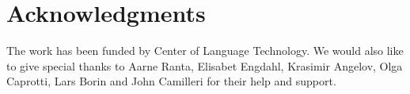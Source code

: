 \documentclass[submission]{eptcs} %
\begin{document}
\section{Acknowledgments}
The work has been funded by Center of Language Technology.
We would also like to give special thanks to Aarne Ranta, %
Elisabet Engdahl, Krasimir Angelov, Olga Caprotti, Lars Borin and John Camilleri for their help
and support.



\nocite{*}


\end{document}
